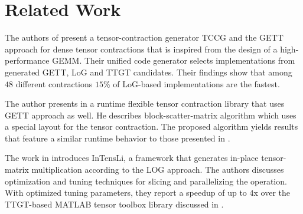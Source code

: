 \section{Related Work}
\label{sec:related}

\begin{comment}
The authors in \cite{dinapoli:2014:towards.efficient.use} discuss the efficient tensor contractions with highly optimized BLAS. 
Based on the LoG approach, they define requirements for the use of \tf{gemm} for class 3 tensor contractions and provide slicing techniques for tensors. %
The slicing recipe for the class 2 categorized tensor contractions contains a short description with a rule of thumb for maximizing performance.
Runtime measurements cover class 3 tensor contractions.
\end{comment}

The authors of \cite{springer:2018:design} present a tensor-contraction generator TCCG and the GETT approach for dense tensor contractions that is inspired from the design of a high-performance GEMM.
Their unified code generator selects implementations from generated GETT, LoG and TTGT candidates.
Their findings show that among $48$ different contractions $15$\% of LoG-based implementations are the fastest.

The author presents in \cite{matthews:2018:high} a runtime flexible tensor contraction library that uses GETT approach as well.
He describes block-scatter-matrix algorithm which uses a special layout for the tensor contraction.
The proposed algorithm yields results that feature a similar runtime behavior to those presented in \cite{springer:2018:design}.

The work in \cite{li:2015:input} introduces InTensLi, a framework that generates in-place tensor-matrix multiplication according to the LOG approach. 
The authors discusses optimization and tuning techniques for slicing and parallelizing the operation.
With optimized tuning parameters, they report a speedup of up to $4$x over the TTGT-based MATLAB tensor toolbox library discussed in \cite{bader:2006:algorithm862}.

